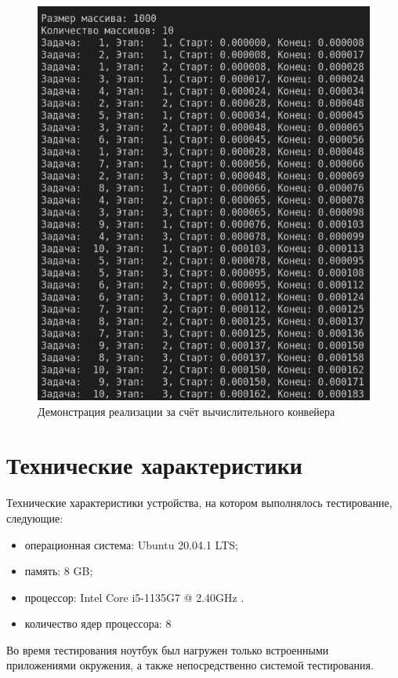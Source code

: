 \FloatBarrier
\begin{figure}[h]
	\begin{center}
		\includegraphics[]{inc/paral.png}
	\end{center}
	\caption{Демонстрация реализации за счёт вычислительного конвейера}
\end{figure}
\FloatBarrier

\section{Технические характеристики}
Технические характеристики устройства, на котором выполнялось тестирование, следующие:
\begin{itemize}
	\item операционная система: Ubuntu 20.04.1 LTS;
	\item память: 8 GB;
	\item процессор: Intel Core i5-1135G7 @ 2.40GHz \cite{intel}.
	\item количество ядер процессора: 8
\end{itemize}

Во время тестирования ноутбук был нагружен только встроенными приложениями окружения, а также непосредственно системой тестирования.

